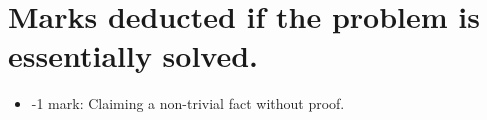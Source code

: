 \documentclass{article}
\begin{document}
	\section{Marks deducted if the problem is essentially solved.}
	\begin{itemize}
		\item {-1 mark: Claiming a non-trivial fact without proof.}
	\end{itemize}
\end{document}
